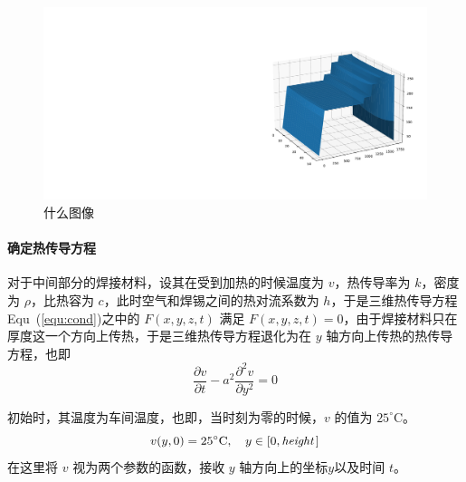 \documentclass[../main.tex]{subfiles}
\begin{document}
\begin{figure}[H]
\centering
\includegraphics[scale = 0.5]{fig1.pdf}\caption{什么图像}
\end{figure}


\paragraph{确定热传导方程} 对于中间部分的焊接材料，设其在受到加热的时候温度为 \(v\)，热传导率为 \(k\)，密度为 \(\rho\)，比热容为 \(c\)，此时空气和焊锡之间的热对流系数为 \(h\)，于是三维热传导方程Equ~(\ref{equ:cond})之中的 \(F (x, y , z, t)\) 满足 \(F ( x , y , z ,t ) = 0\)，由于焊接材料只在厚度这一个方向上传热，于是三维热传导方程退化为在 \(y\) 轴方向上传热的热传导方程，也即
\begin{equation}\label{equ:one-dim}
\frac{\partial v}{\partial t} - a ^{2} \frac{\partial^{2} v }{\partial y ^{2}} = 0
\end{equation}

初始时，其温度为车间温度，也即，当时刻为零的时候，\(v\) 的值为 \(25 ^{\circ}\mathrm{C}\)。
\begin{equation}
v (y, 0) = 25 ^{\circ}\mathrm{C}, \quad y \in [0, {\it height}\kern 1pt]
\end{equation}
在这里将 \(v\) 视为两个参数的函数，接收 \(y\) 轴方向上的坐标\(y\)以及时间 \(t\)。
\end{document}
